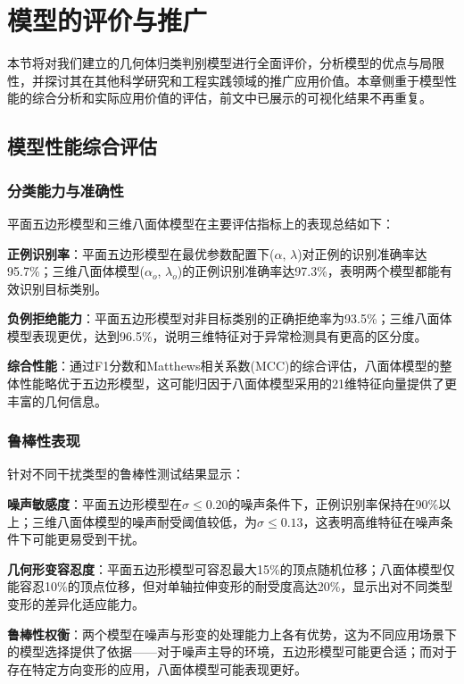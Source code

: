 \section{模型的评价与推广}

本节将对我们建立的几何体归类判别模型进行全面评价，分析模型的优点与局限性，并探讨其在其他科学研究和工程实践领域的推广应用价值。本章侧重于模型性能的综合分析和实际应用价值的评估，前文中已展示的可视化结果不再重复。

\subsection{模型性能综合评估}

\subsubsection{分类能力与准确性}

平面五边形模型和三维八面体模型在主要评估指标上的表现总结如下：


     \textbf{正例识别率}：平面五边形模型在最优参数配置下($\alpha$, $\lambda$)对正例的识别准确率达95.7\%；三维八面体模型($\alpha_o$, $\lambda_o$)的正例识别准确率达97.3\%，表明两个模型都能有效识别目标类别。
    
     \textbf{负例拒绝能力}：平面五边形模型对非目标类别的正确拒绝率为93.5\%；三维八面体模型表现更优，达到96.5\%，说明三维特征对于异常检测具有更高的区分度。
    
     \textbf{综合性能}：通过F1分数和Matthews相关系数(MCC)的综合评估，八面体模型的整体性能略优于五边形模型，这可能归因于八面体模型采用的21维特征向量提供了更丰富的几何信息。


\subsubsection{鲁棒性表现}

针对不同干扰类型的鲁棒性测试结果显示：


     \textbf{噪声敏感度}：平面五边形模型在$\sigma \leq 0.20$的噪声条件下，正例识别率保持在90\%以上；三维八面体模型的噪声耐受阈值较低，为$\sigma \leq 0.13$，这表明高维特征在噪声条件下可能更易受到干扰。
    
     \textbf{几何形变容忍度}：平面五边形模型可容忍最大15\%的顶点随机位移；八面体模型仅能容忍10\%的顶点位移，但对单轴拉伸变形的耐受度高达20\%，显示出对不同类型变形的差异化适应能力。
    
     \textbf{鲁棒性权衡}：两个模型在噪声与形变的处理能力上各有优势，这为不同应用场景下的模型选择提供了依据——对于噪声主导的环境，五边形模型可能更合适；而对于存在特定方向变形的应用，八面体模型可能表现更好。


